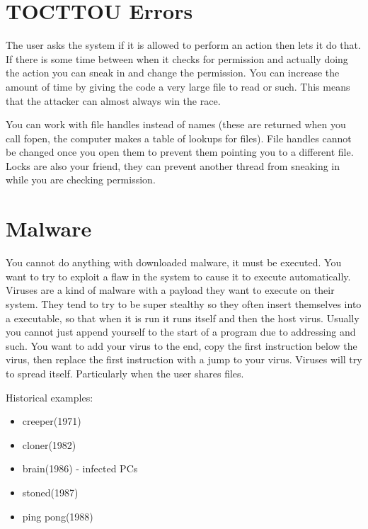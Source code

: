 \documentclass{article}
\begin{document}

\section{TOCTTOU Errors} %
\label{sec:tocttou_errors}
The user asks the system if it is allowed to perform an action then lets it do that. If there is some time between when it checks for permission and actually doing the action you can sneak in and change the permission. You can increase the amount of time by giving the code a very large file to read or such. This means that the attacker can almost always win the race.

You can work with file handles instead of names (these are returned when you call fopen, the computer makes a table of lookups for files). File handles cannot be changed once you open them to prevent them pointing you to a different file. Locks are also your friend, they can prevent another thread from sneaking in while you are checking permission.


\section{Malware} %
\label{sec:malware}
You cannot do anything with downloaded malware, it must be executed. You want to try to exploit a flaw in the system to cause it to execute automatically. Viruses are a kind of malware with a payload they want to execute on their system. They tend to try to be super stealthy so they often insert themselves into a executable, so that when it is run it runs itself and then the host virus. Usually you cannot just append yourself to the start of a program due to addressing and such. You want to add your virus to the end, copy the first instruction below the virus, then replace the first instruction with a jump to your virus. Viruses will try to spread itself. Particularly when the user shares files.

Historical examples:
\begin{itemize}
	\item creeper(1971)
	\item cloner(1982)
	\item brain(1986) - infected PCs
	\item stoned(1987)
	\item ping pong(1988)
\end{itemize}
\end{document}
